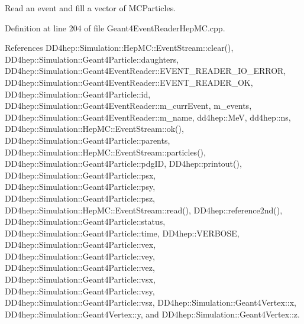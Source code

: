 Read an event and fill a vector of M\+C\+Particles. 



Definition at line 204 of file Geant4\+Event\+Reader\+Hep\+M\+C.\+cpp.



References D\+D4hep\+::\+Simulation\+::\+Hep\+M\+C\+::\+Event\+Stream\+::clear(), D\+D4hep\+::\+Simulation\+::\+Geant4\+Particle\+::daughters, D\+D4hep\+::\+Simulation\+::\+Geant4\+Event\+Reader\+::\+E\+V\+E\+N\+T\+\_\+\+R\+E\+A\+D\+E\+R\+\_\+\+I\+O\+\_\+\+E\+R\+R\+OR, D\+D4hep\+::\+Simulation\+::\+Geant4\+Event\+Reader\+::\+E\+V\+E\+N\+T\+\_\+\+R\+E\+A\+D\+E\+R\+\_\+\+OK, D\+D4hep\+::\+Simulation\+::\+Geant4\+Particle\+::id, D\+D4hep\+::\+Simulation\+::\+Geant4\+Event\+Reader\+::m\+\_\+curr\+Event, m\+\_\+events, D\+D4hep\+::\+Simulation\+::\+Geant4\+Event\+Reader\+::m\+\_\+name, dd4hep\+::\+MeV, dd4hep\+::ns, D\+D4hep\+::\+Simulation\+::\+Hep\+M\+C\+::\+Event\+Stream\+::ok(), D\+D4hep\+::\+Simulation\+::\+Geant4\+Particle\+::parents, D\+D4hep\+::\+Simulation\+::\+Hep\+M\+C\+::\+Event\+Stream\+::particles(), D\+D4hep\+::\+Simulation\+::\+Geant4\+Particle\+::pdg\+ID, D\+D4hep\+::printout(), D\+D4hep\+::\+Simulation\+::\+Geant4\+Particle\+::psx, D\+D4hep\+::\+Simulation\+::\+Geant4\+Particle\+::psy, D\+D4hep\+::\+Simulation\+::\+Geant4\+Particle\+::psz, D\+D4hep\+::\+Simulation\+::\+Hep\+M\+C\+::\+Event\+Stream\+::read(), D\+D4hep\+::reference2nd(), D\+D4hep\+::\+Simulation\+::\+Geant4\+Particle\+::status, D\+D4hep\+::\+Simulation\+::\+Geant4\+Particle\+::time, D\+D4hep\+::\+V\+E\+R\+B\+O\+SE, D\+D4hep\+::\+Simulation\+::\+Geant4\+Particle\+::vex, D\+D4hep\+::\+Simulation\+::\+Geant4\+Particle\+::vey, D\+D4hep\+::\+Simulation\+::\+Geant4\+Particle\+::vez, D\+D4hep\+::\+Simulation\+::\+Geant4\+Particle\+::vsx, D\+D4hep\+::\+Simulation\+::\+Geant4\+Particle\+::vsy, D\+D4hep\+::\+Simulation\+::\+Geant4\+Particle\+::vsz, D\+D4hep\+::\+Simulation\+::\+Geant4\+Vertex\+::x, D\+D4hep\+::\+Simulation\+::\+Geant4\+Vertex\+::y, and D\+D4hep\+::\+Simulation\+::\+Geant4\+Vertex\+::z.

\hypertarget{class_d_d4hep_1_1_simulation_1_1_geant4_event_reader_hep_m_c_a02a4d905385f3b587ffe953e129aad5f}{}\label{class_d_d4hep_1_1_simulation_1_1_geant4_event_reader_hep_m_c_a02a4d905385f3b587ffe953e129aad5f} 
